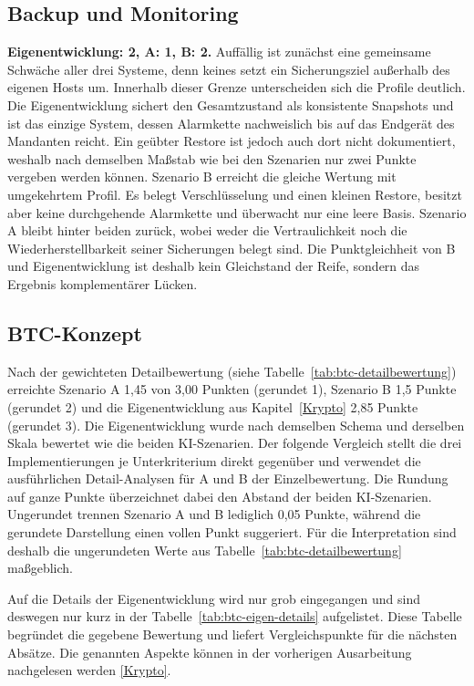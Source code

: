{\subsection{Backup und Monitoring}
\textbf{Eigenentwicklung: 2, A: 1, B: 2.} Auffällig ist zunächst eine gemeinsame Schwäche aller drei Systeme, denn keines setzt ein Sicherungsziel außerhalb des eigenen Hosts um. Innerhalb dieser Grenze unterscheiden sich die Profile deutlich. 
Die Eigenentwicklung sichert den Gesamtzustand als konsistente Snapshots und ist das einzige System, dessen Alarmkette nachweislich bis auf das Endgerät des Mandanten reicht. Ein geübter Restore ist jedoch auch dort nicht dokumentiert, weshalb nach demselben Maßstab wie bei den Szenarien nur zwei Punkte vergeben werden können. 
Szenario B erreicht die gleiche Wertung mit umgekehrtem Profil. Es belegt Verschlüsselung und einen kleinen Restore, besitzt aber keine durchgehende Alarmkette und überwacht nur eine leere Basis. 
Szenario A bleibt hinter beiden zurück, wobei weder die Vertraulichkeit noch die Wiederherstellbarkeit seiner Sicherungen belegt sind. Die Punktgleichheit von B und Eigenentwicklung ist deshalb kein Gleichstand der Reife, sondern das Ergebnis komplementärer Lücken.\cite{runbookA,selfauditA,backupscriptA,finalsummaryB,validatornotesB}

\subsection{\ac{BTC}-Konzept}
Nach der gewichteten Detailbewertung (siehe Tabelle~\ref{tab:btc-detailbewertung}) erreichte Szenario A 1{,}45 von 3{,}00 Punkten (gerundet 1), Szenario B 1{,}5 Punkte (gerundet 2) und die Eigenentwicklung aus Kapitel~\ref{Krypto} 2{,}85 Punkte (gerundet 3). 
Die Eigenentwicklung wurde nach demselben Schema und derselben Skala bewertet wie die beiden \ac{KI}-Szenarien. Der folgende Vergleich stellt die drei Implementierungen je Unterkriterium direkt gegenüber und verwendet die ausführlichen Detail-Analysen für A und B der Einzelbewertung.
Die Rundung auf ganze Punkte überzeichnet dabei den Abstand der beiden \ac{KI}-Szenarien. Ungerundet trennen Szenario A und B lediglich 0{,}05 Punkte, während die gerundete Darstellung einen vollen Punkt suggeriert. Für die Interpretation sind deshalb die ungerundeten Werte aus Tabelle~\ref{tab:btc-detailbewertung} maßgeblich.

Auf die Details der Eigenentwicklung wird nur grob eingegangen und sind deswegen nur kurz in der Tabelle~\ref{tab:btc-eigen-details} aufgelistet. Diese Tabelle begründet die gegebene Bewertung und liefert Vergleichspunkte für die nächsten Absätze. Die genannten Aspekte können in der vorherigen Ausarbeitung nachgelesen werden \ref{Krypto}.

}
